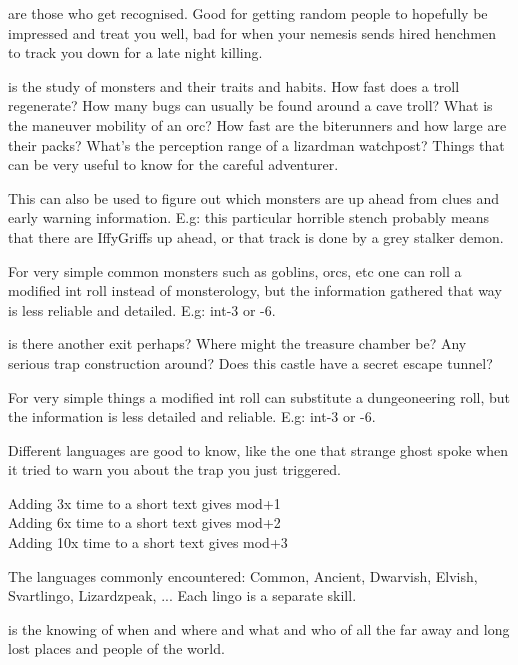  are those who get recognised. Good for getting random people to hopefully be impressed and treat you well, bad for when your nemesis sends hired henchmen to track you down for a late night killing.


 is the study of monsters and their traits and habits. How fast does a troll regenerate? How many bugs can usually be found around a cave troll? What is the maneuver mobility of an orc? How fast are the biterunners and how large are their packs? What's the perception range of a lizardman watchpost? Things that can be very useful to know for the careful adventurer.

This can also be used to figure out which monsters are up ahead from clues and early warning information. E.g: this particular horrible stench probably means that there are IffyGriffs up ahead, or that track is done by a grey stalker demon.

For very simple common monsters such as goblins, orcs, etc one can roll a modified int roll instead of monsterology, but the information gathered that way is less reliable and detailed. E.g: int-3 or -6.


 is there another exit perhaps? Where might the treasure chamber be? Any serious trap construction around? Does this castle have a secret escape tunnel?

For very simple things a modified int roll can substitute a dungeoneering roll, but the information is less detailed and reliable. E.g: int-3 or -6.


 Different languages are good to know, like the one that strange ghost spoke when it tried to warn you about the trap you just triggered.

Adding 3x time to a short text gives mod+1 \\
Adding 6x time to a short text gives mod+2 \\
Adding 10x time to a short text gives mod+3

The languages commonly encountered: Common, Ancient, Dwarvish, Elvish, Svartlingo, Lizardzpeak, ...  Each lingo is a separate skill.


 is the knowing of when and where and what and who of all the far away and long lost places and people of the world.

